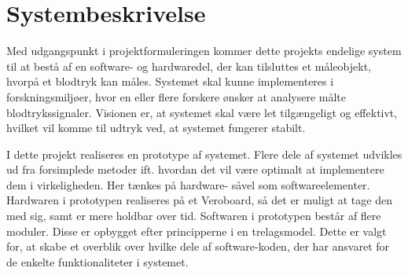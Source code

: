 \chapter{Systembeskrivelse}
Med udgangspunkt i projektformuleringen kommer dette projekts endelige system til at bestå af en software- og hardwaredel, der kan tilsluttes et måleobjekt, hvorpå et blodtryk kan måles. Systemet skal kunne implementeres i forskningsmiljøer, hvor en eller flere forskere ønsker at analysere målte blodtrykssignaler. Visionen er, at systemet skal være let tilgængeligt og effektivt, hvilket vil komme til udtryk ved, at systemet fungerer stabilt.

I dette projekt realiseres en prototype af systemet. Flere dele af systemet udvikles ud fra forsimplede metoder ift. hvordan det vil være optimalt at implementere dem i virkeligheden. Her tænkes på hardware- såvel som softwareelementer. Hardwaren i prototypen realiseres på et Veroboard, så det er muligt at tage den med sig, samt er mere holdbar over tid. Softwaren i prototypen består af flere moduler. Disse er opbygget efter principperne i en trelagsmodel. Dette er valgt for, at skabe et overblik over hvilke dele af software-koden, der har ansvaret for de enkelte funktionaliteter i systemet.

